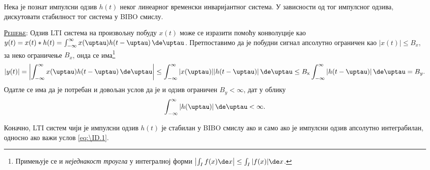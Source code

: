 \PID \label{z:bibo_imp}
Нека је познат импулсни одзив $h(t)$ неког линеарног временски инваријантног система.
У зависности од тог импулсног одзива, дискутовати стабилност тог система у BIBO смислу.
\vspace*{2mm}

\textsc{\underline{Решење}}: Одзив LTI система на произвољну побуду $x(t)$ може се изразити 
помоћу конволуције као 
$y(t) = x(t) \ast h(t) = \int_{-\infty}^{\infty} x(\uptau) h(t - \uptau )\, \de \uptau$. Претпоставимо да је 
побудни сигнал апсолутно ограничен као $|x(t)| \leq B_{x}$, за неко ограничење $B_x$, онда се 
има\footnote{Примењује се и \textit{неједнакост троугла} у интегралној форми 
$\left\lvert \int_I f(x) \de x \right\rvert \leq \int_I |f(x)| \de x$.
} 
\begin{equation}
    |y(t)| = 
    \left\lvert
    \int_{-\infty}^{\infty} x(\uptau) h(t - \uptau )\, \de \uptau 
    \right\rvert \leq
    \int_{-\infty}^{\infty} |x(\uptau)| |h(t - \uptau )|\, \de \uptau \leq 
    B_{\rm x} \int_{-\infty}^{\infty} |h(t - \uptau )|\, \de \uptau = B_{y}.
\end{equation}
Одатле се има да је потребан и довољан услов да је и одзив ограничен $B_y < \infty$, дат у облику
\begin{equation}
\int_{-\infty}^{\infty} |h(\uptau )|\, \de \uptau < \infty. \label{eq:\ID.1}
\end{equation}

Коначно, LTI систем  чији је импулсни одзив $h(t)$ је стабилан у BIBO смислу ако и само ако је
импулсни одзив апсолутно интеграбилан, односно ако важи услов \eqref{eq:\ID.1}.

